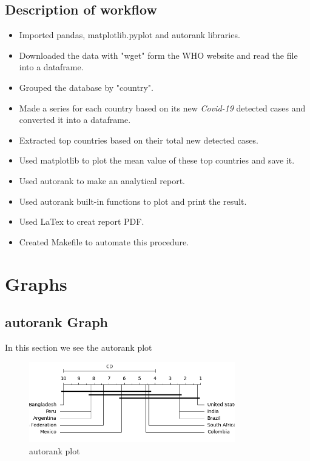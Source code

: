 \documentclass[12pt, letterpaper, twoside]{report}
\begin{document}
\section{Description of workflow}
\begin{itemize}
  \item Imported pandas, matplotlib.pyplot and autorank libraries.
  \item Downloaded the data with "wget" form the WHO website and read the file into a dataframe.
  \item Grouped the database by "country".
  \item Made a series for each country based on its new \textit{Covid-19} detected cases and converted it into a dataframe.
  \item Extracted top countries based on their total new detected cases.
  \item Used matplotlib to plot the mean value of these top countries and save it.
  \item Used autorank to make an analytical report.
  \item Used autorank built-in functions to plot and print the result.
  \item Used LaTex to creat report PDF.
  \item Created Makefile to automate this procedure.
\end{itemize}

\chapter{Graphs}
\section{autorank Graph}
In this section we see the autorank plot
\begin{figure}[ht]
    \centering
    \includegraphics[width=0.8\textwidth]{autorank.png}
    \caption{autorank plot}
    \label{fig:autorank}
\end{figure} 
\end{document}
